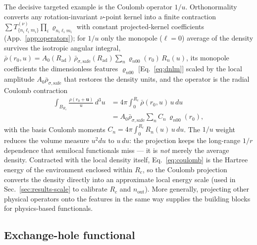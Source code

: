\documentclass[aps,prb,reprint,superscriptaddress,nofootinbib]{revtex4-2}
\newcommand{\uu}{\mathbf{u}}
\newcommand{\Rad}{R_{\mathrm{ad}}}
\newcommand{\Rc}{R_{c}}
\newcommand{\nout}{n_{\mathrm{out}}}
\begin{document}
The decisive targeted example is the Coulomb operator $1/u$. Orthonormality converts
any rotation-invariant $\nu$-point kernel into a finite contraction
$\sum T^{(\nu)}_{\{n_i\ell_i m_i\}}\prod_i \varrho_{n_i\ell_i m_i}$ with constant
projected-kernel coefficients (App.~\ref{app:operators}); for $1/u$ only the monopole
($\ell=0$) average of the density survives the isotropic angular integral,
$\bar\rho(r_0,u)=A_0(\Rad)\,\bar\rho_{\sigma,\mathrm{safe}}(\Rad)\sum_n \varrho_{n00}(r_0)\,R_n(u)$,
its monopole coefficients the dimensionless features $\varrho_{n00}$ [Eq.~\eqref{eq:dnlm}] scaled by
the local amplitude $A_0\bar\rho_{\sigma,\mathrm{safe}}$ that restores the density units, and the
operator is the radial Coulomb contraction
\begin{equation}
\label{eq:coulomb}
\begin{aligned}
\int_{B_{\Rc}}\!\frac{\rho(r_0+\uu)}{u}\,d^3u
&=4\pi\!\int_0^{\Rc}\!\bar\rho(r_0,u)\,u\,du\\
&=A_0\bar\rho_{\sigma,\mathrm{safe}}\sum_n C_n\,\varrho_{n00}(r_0),
\end{aligned}
\end{equation}
with the basis Coulomb moments $C_n=4\pi\int_0^{\Rc}R_n(u)\,u\,du$. The $1/u$ weight reduces the volume
measure $u^2du$ to $u\,du$: the projection keeps the long-range $1/r$ dependence that
semilocal functionals miss --- it is \emph{not} merely the average density. Contracted
with the local density itself, Eq.~\eqref{eq:coulomb} is the Hartree energy of the
environment enclosed within $\Rc$, so the Coulomb projection converts the density
directly into an approximate local energy scale (used in Sec.~\ref{sec:results-scale}
to calibrate $\Rc$ and $\nout$). More generally, projecting other physical operators
onto the features in the same way supplies the building blocks for physics-based
functionals.

\subsection{Exchange-hole functional}
\label{sec:hole}
\end{document}

